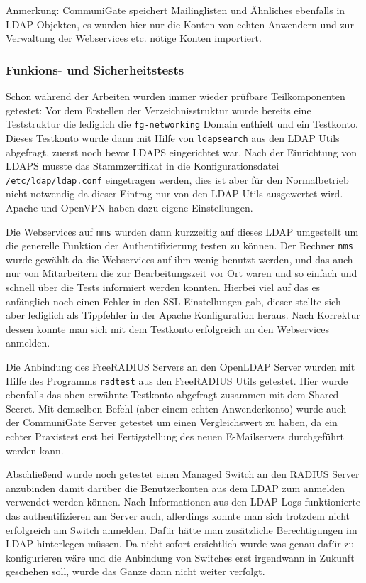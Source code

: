 \documentclass[11pt,a4paper,titlepage=firstiscover,headsepline]{scrartcl} %
\begin{document}
Anmerkung: CommuniGate speichert Mailinglisten und Ähnliches ebenfalls in LDAP Objekten, es wurden hier nur die Konten von echten Anwendern und zur Verwaltung der Webservices etc. nötige Konten importiert.

\subsubsection{Funkions- und Sicherheitstests}
Schon während der Arbeiten wurden immer wieder prüfbare Teilkomponenten getestet: 
Vor dem Erstellen der Verzeichnisstruktur wurde bereits eine Teststruktur die lediglich die \texttt{fg-networking} Domain enthielt und ein Testkonto. Dieses Testkonto wurde dann mit Hilfe von \texttt{ldapsearch} aus den LDAP Utils abgefragt, zuerst noch bevor LDAPS eingerichtet war. Nach der Einrichtung von LDAPS musste das Stammzertifikat in die Konfigurationsdatei \texttt{/etc/ldap/ldap.conf} eingetragen werden, dies ist aber für den Normalbetrieb nicht notwendig da dieser Eintrag nur von den LDAP Utils ausgewertet wird. Apache und OpenVPN haben dazu eigene Einstellungen.

Die Webservices auf \texttt{nms} wurden dann kurzzeitig auf dieses LDAP umgestellt um die generelle Funktion der Authentifizierung testen zu können. Der Rechner \texttt{nms} wurde gewählt da die Webservices auf ihm wenig benutzt werden, und das auch nur von Mitarbeitern die zur Bearbeitungszeit vor Ort waren und so einfach und schnell über die Tests informiert werden konnten. Hierbei viel auf das es anfänglich noch einen Fehler in den SSL Einstellungen gab, dieser stellte sich aber lediglich als Tippfehler in der Apache Konfiguration heraus. Nach Korrektur dessen konnte man sich mit dem Testkonto erfolgreich an den Webservices anmelden.

Die Anbindung des FreeRADIUS Servers an den OpenLDAP Server wurden mit Hilfe des Programms \texttt{radtest} aus den FreeRADIUS Utils getestet. Hier wurde ebenfalls das oben erwähnte Testkonto abgefragt zusammen mit dem Shared Secret. Mit demselben Befehl (aber einem echten Anwenderkonto) wurde auch der CommuniGate Server getestet um einen Vergleichswert zu haben, da ein echter Praxistest erst bei Fertigstellung des neuen E-Mailservers durchgeführt werden kann.

Abschließend wurde noch getestet einen Managed Switch an den RADIUS Server anzubinden damit darüber die Benutzerkonten aus dem LDAP zum anmelden verwendet werden können. Nach Informationen aus den LDAP Logs funktionierte das authentifizieren am Server auch, allerdings konnte man sich trotzdem nicht erfolgreich am Switch anmelden. Dafür hätte man zusätzliche Berechtigungen im LDAP hinterlegen müssen. Da nicht sofort ersichtlich wurde was genau dafür zu konfigurieren wäre und die Anbindung von Switches erst irgendwann in Zukunft geschehen soll, wurde das Ganze dann nicht weiter verfolgt.
\end{document}
